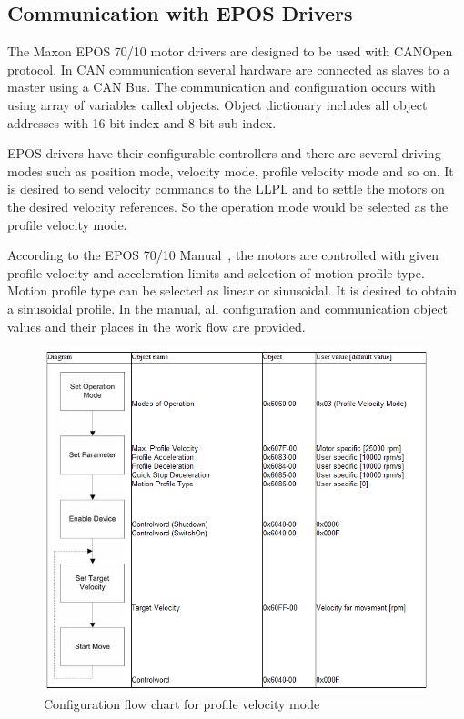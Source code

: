 	\subsection{Communication with EPOS Drivers}
	\label{subsec:comm with epos}
	The Maxon EPOS 70/10 motor drivers are designed to be used with CANOpen protocol. In CAN communication several hardware are connected as slaves to a master using a CAN Bus. The communication and configuration occurs with using array of variables called objects. Object dictionary includes all object addresses with 16-bit index and 8-bit sub index. 
	\par
	EPOS drivers have their configurable controllers and there are several driving modes such as position mode, velocity mode, profile velocity mode and so on. It is desired to send velocity commands to the LLPL and to settle the motors on the desired velocity references. So the operation mode would be selected as the profile velocity mode. 
	\par
	According to the EPOS 70/10 Manual~\cite{eposManual}, the motors are controlled with given profile velocity and acceleration limits and selection of motion profile type. Motion profile type can be selected as linear or sinusoidal. It is desired to obtain a sinusoidal profile. In the manual, all configuration and communication object values and their places in the work flow are provided. 
	\par
	\begin{figure}[h]
		\centering
		\includegraphics[scale=0.7]{images/eposProfileVelocity}
		\caption{Configuration flow chart for profile velocity mode ~\cite{eposManual}}
		\label{fig:eposProfileVelocity}
	\end{figure}
